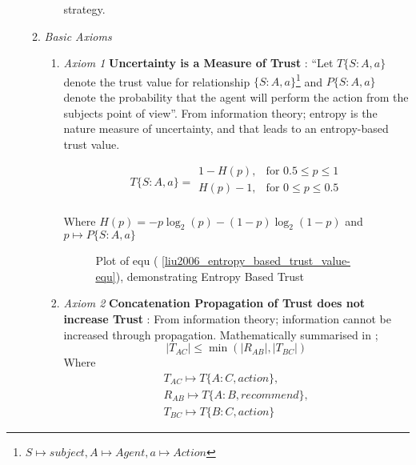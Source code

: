 \begin{itemize}
\begin{enumerate}
\begin{itemize}
            strategy.
        \end{itemize}
      \item \emph{Basic Axioms}\label{liu2006_basicaxioms}
        \begin{enumerate}
          \item \label{Axiom1} \emph{Axiom 1} \textbf{Uncertainty is a Measure of Trust} : ``Let \(T\{S:A,a\}\)
            denote the trust value for relationship \(\{S:A,a\}\)\footnote{\(S\mapsto subject,
            A\mapsto Agent, a\mapsto Action\)} and \(P\{S:A,a\}\) denote the
            probability that the agent will perform the action from the subjects point
            of view''. From information theory; entropy is the nature measure of
            uncertainty, and that leads to an entropy-based trust value.  

            \begin{equation}
              T\{S:A,a\} =\begin{array}{cc} 
                1 - H(p), & \mbox{for } 0.5\leq p \leq 1 \\
                H(p) - 1, & \mbox{for } 0\leq p \le 0.5 \\  	  
              \end{array}
              \label{liu2006_entropy_based_trust_value-equ}
            \end{equation}

            Where \(H(p) = -p \log_2(p) - (1-p)\log_2(1-p)\) and \(p\mapsto
            P\{S:A,a\}\)

            \begin{wrapfigure}{R}{0.45\textwidth}
              
              \caption{Plot of equ (\protect
              \ref{liu2006_entropy_based_trust_value-equ}), demonstrating Entropy Based
              Trust}
            \end{wrapfigure}
          \item \label{Axiom2} \emph{Axiom 2} \textbf{Concatenation Propagation of Trust does not increase Trust} :
            From information theory; information cannot be increased through
            propagation. Mathematically summarised in
            ;
            \begin{equation}
              |T_{AC}| \leq \min(|R_{AB}|,|T_{BC}|)
              \label{liu2006_concatenation_propagation-equ}
            \end{equation}
            Where 
            \begin{equation}
              \begin{array}{l} T_{AC}\mapsto T\{A:C, action\},\\
                R_{AB}\mapsto T\{A:B, recommend\},\\ 
                T_{BC}\mapsto T\{B:C, action\}
              \end{array}
            \end{equation}


\end{enumerate}
\end{enumerate}
\end{itemize}
